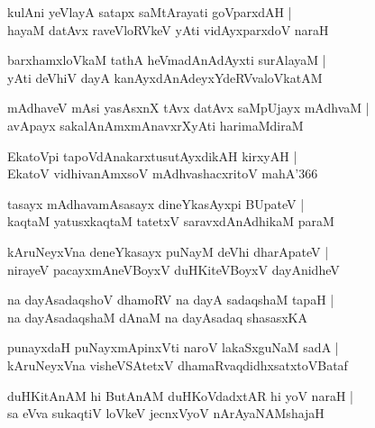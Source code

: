 \documentclass[twoside,12pt,openright]{book}
\newcounter{shloka}[chapter]
\begin{document}
\begin{shloka}%
kulAni yeVlayA satapx saMtArayati goVparxdAH |\\
hayaM datAvx raveVloRVkeV yAti vidAyxparxdoV naraH 
\end{shloka}

\begin{shloka}%
barxhamxloVkaM tathA heVmadAnAdAyxti surAlayaM |\\
yAti deVhiV dayA kanAyxdAnAdeyxYdeRVvaloVkatAM 
\end{shloka}

\begin{shloka}%
mAdhaveV mAsi yasAsxnX tAvx datAvx saMpUjayx mAdhvaM |\\
avApayx sakalAnAmxmAnavxrXyAti harimaMdiraM 
\end{shloka}

\begin{shloka}%
EkatoVpi tapoVdAnakarxtusutAyxdikAH kirxyAH |\\
EkatoV vidhivanAmxsoV mAdhvashacxritoV mahA\char'366
\end{shloka}

\begin{shloka}%
tasayx mAdhavamAsasayx dineYkasAyxpi BUpateV |\\
kaqtaM yatusxkaqtaM tatetxV saravxdAnAdhikaM paraM 
\end{shloka}

\begin{shloka}%
kAruNeyxVna deneYkasayx puNayM deVhi dharApateV |\\
nirayeV pacayxmAneVBoyxV duHKiteVBoyxV dayAnidheV 
\end{shloka}

\begin{shloka}%
na dayAsadaqshoV dhamoRV na dayA sadaqshaM tapaH |\\
na dayAsadaqshaM dAnaM na dayAsadaq	shasasxKA 
\end{shloka}

\begin{shloka}%
punayxdaH puNayxmApinxVti naroV lakaSxguNaM sadA |\\
kAruNeyxVna visheVSAtetxV dhamaRvaqdidhxsatxtoVBataf 
\end{shloka}

\begin{shloka}%
duHKitAnAM hi ButAnAM duHKoVdadxtAR hi yoV naraH |\\
sa eVva sukaqtiV loVkeV jecnxVyoV nArAyaNAMshajaH 
\end{shloka}
\end{document}

